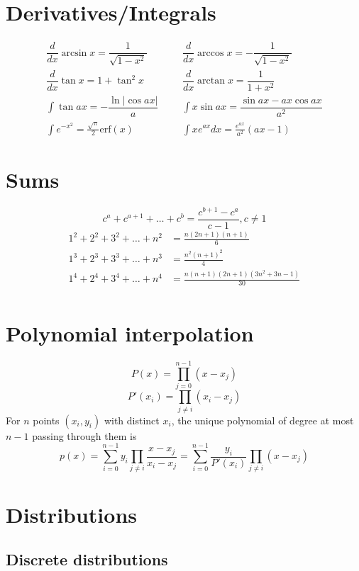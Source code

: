 \section{Derivatives/Integrals}
\begin{align*}
	\dfrac{d}{dx}\arcsin x = \dfrac{1}{\sqrt{1-x^2}} &&& \dfrac{d}{dx}\arccos x = -\dfrac{1}{\sqrt{1-x^2}} \\
	\dfrac{d}{dx}\tan x = 1+\tan^2 x &&& \dfrac{d}{dx}\arctan x = \dfrac{1}{1+x^2} \\
	\int\tan ax = -\dfrac{\ln|\cos ax|}{a} &&& \int x\sin ax = \dfrac{\sin ax-ax \cos ax}{a^2} \\
	\int e^{-x^2} = \frac{\sqrt \pi}{2} \text{erf}(x) &&& \int xe^{ax}dx = \frac{e^{ax}}{a^2}(ax-1)
\end{align*}

\section{Sums}
\[ c^a + c^{a+1} + \dots + c^{b} = \frac{c^{b+1} - c^a}{c-1}, c \neq 1 \]
\begin{align*}
	1^2 + 2^2 + 3^2 + \dots + n^2 &= \frac{n(2n+1)(n+1)}{6} \\
	1^3 + 2^3 + 3^3 + \dots + n^3 &= \frac{n^2(n+1)^2}{4} \\
	1^4 + 2^4 + 3^4 + \dots + n^4 &= \frac{n(n+1)(2n+1)(3n^2 + 3n - 1)}{30} \\
\end{align*}

\section{Polynomial interpolation}
\[P(x)=\prod_{j=0}^{n-1}(x-x_j)\]
\[
P'(x_i) = \prod_{j \ne i}(x_i-x_j)
\]
For $n$ points $(x_i,y_i)$ with distinct $x_i$, the unique polynomial of degree at most $n-1$ passing through them is
\[
	p(x) = \sum_{i=0}^{n-1} y_i \prod_{j \ne i} \frac{x-x_j}{x_i-x_j} = \sum_{i=0}^{n-1} \frac{y_i}{P'(x_i)} \prod_{j \ne i} (x - x_j)
\]

\section{Distributions}

\subsection{Discrete distributions}

